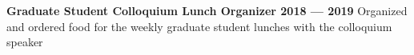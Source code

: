 \documentclass[10pt]{article}
\newcommand{\actionHeader}[2]{\textbf{#1 \hfill #2}}
\newcommand{\indentedItem}[1]{\newline\null\qquad #1}
\begin{document}
\actionHeader{Graduate Student Colloquium Lunch Organizer}{2018 --- 2019}
\indentedItem{Organized and ordered food for the weekly graduate student lunches with the colloquium speaker}




\end{document}
